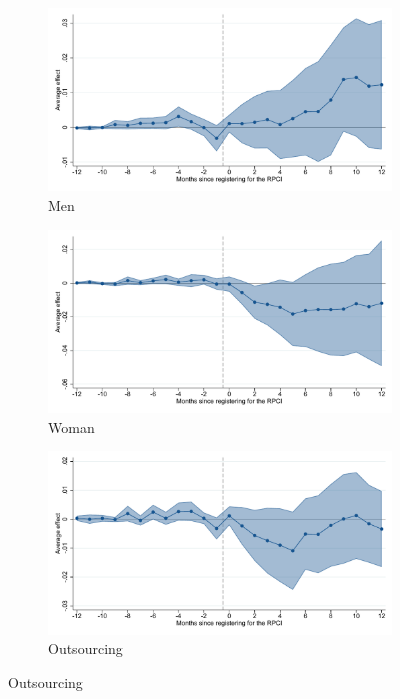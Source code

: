 \begin{figure}[H]
    \centering
    \caption{Event studies - RPCI effect on enrollment}
    
    \begin{subfigure}{0.32\textwidth}
    \caption{Men}
    \includegraphics[width=\textwidth]{04_Figures/muestra_10porciento/event_study_alta_hombre_dcdh_connected.pdf}
    \end{subfigure}
    \begin{subfigure}{0.32\textwidth}
    \caption{Woman}
    \includegraphics[width=\textwidth]{04_Figures/muestra_10porciento/event_study_alta_mujer_dcdh_connected.pdf}
    \end{subfigure}
    \begin{subfigure}{0.32\textwidth}
    \caption{Outsourcing}
    \includegraphics[width=\textwidth]{04_Figures/muestra_10porciento/event_study_alta_base_outsourcing_dcdh_connected.pdf}
    \end{subfigure}
    

\end{figure}

